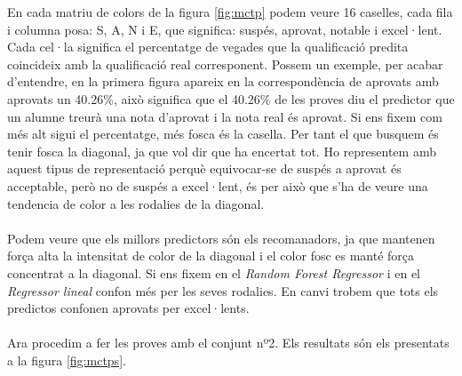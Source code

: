 \documentclass[12pt,a4paper,catalan]{article}
\begin{document}
En cada matriu de colors de la figura \ref{fig:mctp} podem veure 16 caselles, cada fila i columna posa: S, A, N i E, que significa: suspés, aprovat, notable i excel·lent. Cada cel·la significa el percentatge de vegades que la qualificació predita coincideix amb la qualificació real corresponent. Possem un exemple, per acabar d'entendre, en la primera figura apareix en la correspondència de aprovats amb aprovats un 40.26\%, això significa que el 40.26\% de les proves diu el predictor que un alumne treurà una nota d'aprovat i la nota real és aprovat. Si ens fixem com més alt sigui el percentatge, més fosca és la casella. Per tant el que busquem és tenir fosca la diagonal, ja que vol dir que ha encertat tot. Ho representem amb aquest tipus de representació perquè equivocar-se de suspés a aprovat és acceptable, però no de suspés a excel·lent, és per això que s'ha de veure una tendencia de color a les rodalies de la diagonal.
\\
\\
Podem veure que els millors predictors són els recomanadors, ja que mantenen força alta la intensitat de color de la diagonal i el color fosc es manté força concentrat a la diagonal. Si ens fixem en el \textit{Random Forest Regressor} i en el \textit{Regressor lineal} confon més per les seves rodalies. En canvi trobem que tots els predictos confonen aprovats per excel·lents.
\\
\\
Ara procedim a fer les proves amb el conjunt nº2. Els resultats són els presentats a la figura \ref{fig:mctps}.
\end{document}
